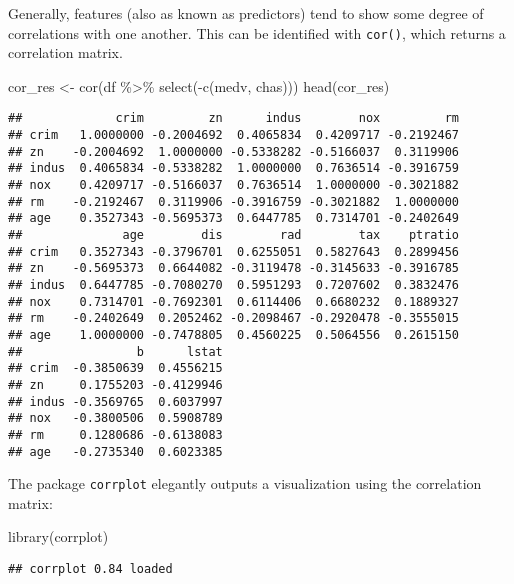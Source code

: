 \documentclass[
]{book}
\newenvironment{Shaded}{\begin{snugshade}}{\end{snugshade}}
\newcommand{\FunctionTok}[1]{\textcolor[rgb]{0.00,0.00,0.00}{#1}}
\newcommand{\NormalTok}[1]{#1}
\newcommand{\OtherTok}[1]{\textcolor[rgb]{0.56,0.35,0.01}{#1}}
\newcommand{\SpecialCharTok}[1]{\textcolor[rgb]{0.00,0.00,0.00}{#1}}
\begin{document}
Generally, features (also as known as predictors) tend to show some degree of correlations with one another. This can be identified with \texttt{cor()}, which returns a correlation matrix.

\begin{Shaded}
\begin{Highlighting}[]
\NormalTok{cor\_res }\OtherTok{\textless{}{-}} \FunctionTok{cor}\NormalTok{(df }\SpecialCharTok{\%\textgreater{}\%} \FunctionTok{select}\NormalTok{(}\SpecialCharTok{{-}}\FunctionTok{c}\NormalTok{(medv, chas)))}
\FunctionTok{head}\NormalTok{(cor\_res)}
\end{Highlighting}
\end{Shaded}

\begin{verbatim}
##             crim         zn      indus        nox         rm
## crim   1.0000000 -0.2004692  0.4065834  0.4209717 -0.2192467
## zn    -0.2004692  1.0000000 -0.5338282 -0.5166037  0.3119906
## indus  0.4065834 -0.5338282  1.0000000  0.7636514 -0.3916759
## nox    0.4209717 -0.5166037  0.7636514  1.0000000 -0.3021882
## rm    -0.2192467  0.3119906 -0.3916759 -0.3021882  1.0000000
## age    0.3527343 -0.5695373  0.6447785  0.7314701 -0.2402649
##              age        dis        rad        tax    ptratio
## crim   0.3527343 -0.3796701  0.6255051  0.5827643  0.2899456
## zn    -0.5695373  0.6644082 -0.3119478 -0.3145633 -0.3916785
## indus  0.6447785 -0.7080270  0.5951293  0.7207602  0.3832476
## nox    0.7314701 -0.7692301  0.6114406  0.6680232  0.1889327
## rm    -0.2402649  0.2052462 -0.2098467 -0.2920478 -0.3555015
## age    1.0000000 -0.7478805  0.4560225  0.5064556  0.2615150
##                b      lstat
## crim  -0.3850639  0.4556215
## zn     0.1755203 -0.4129946
## indus -0.3569765  0.6037997
## nox   -0.3800506  0.5908789
## rm     0.1280686 -0.6138083
## age   -0.2735340  0.6023385
\end{verbatim}

The package \texttt{corrplot} elegantly outputs a visualization using the correlation matrix:

\begin{Shaded}
\begin{Highlighting}[]
\FunctionTok{library}\NormalTok{(corrplot)}
\end{Highlighting}
\end{Shaded}

\begin{verbatim}
## corrplot 0.84 loaded
\end{verbatim}
\end{document}

